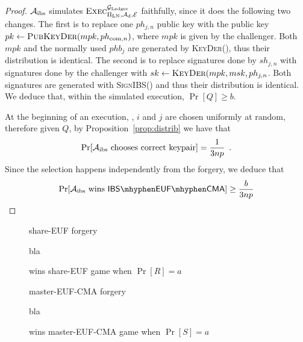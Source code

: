  \begin{proof}
    $\mathcal{A}_{\mathrm{ibs}}$ simulates
    $\textsc{Exec}^{\mathcal{G}_{\mathrm{Ledger}}}_{\Pi_{\mathrm{LN}}, \mathcal{A}_{\mathrm{d}},
    \mathcal{E}}$ faithfully, since it does the following two changes. The
    first is to replace one $ph_{j, n}$ public key with the public key $pk \gets
    \textsc{PubKeyDer}(mpk, ph_{\mathrm{com}, n})$, where $mpk$ is given by the
    challenger. Both $mpk$ and the normally used $phb_j$ are generated by
    \textsc{KeyDer}(), thus their distribution is identical. The second is to
    replace signatures done by $sh_{j, n}$ with signatures done by the
    challenger with $sk \gets \textsc{KeyDer}(mpk, msk, ph_{j, n}$. Both
    signatures are generated with \textsc{SignIBS}() and thus their distribution
    is identical. We deduce that, within the simulated execution, $\Pr[Q] \geq
    b$.

    At the beginning of an execution, \alice, $i$ and $j$ are chosen uniformly
    at random, therefore given $Q$, by Proposition~\ref{prop:distrib} we have
    that
    \begin{equation*}
      \Pr[\mathcal{A}_{\mathrm{ibs}} \text{ chooses correct keypair}] =
      \frac{1}{3np} \enspace.
    \end{equation*}
    Since the selection happens independently from the forgery, we deduce that
    \begin{equation*}
      \Pr[\adversary_{\mathrm{ibs}} \text{ wins } \mathsf{IBS \mhyphen EUF
      \mhyphen CMA}] \geq \frac{b}{3np}
    \end{equation*}
  \end{proof}

  \begin{figure}[H]
    \begin{algobox}{\textsf{share-EUF} forgery}
      \begin{algorithmic}[1]
        \State bla
      \end{algorithmic}
    \end{algobox}
    \caption{wins \textsf{share-EUF} game when $\Pr[R] = a$}
    \label{alg:forge:share}
  \end{figure}

  \begin{figure}[H]
    \begin{algobox}{\textsf{master-EUF-CMA} forgery}
      \begin{algorithmic}[1]
        \State bla
      \end{algorithmic}
    \end{algobox}
    \caption{wins \textsf{master-EUF-CMA} game when $\Pr[S] = a$}
    \label{alg:forge:master}
  \end{figure}
